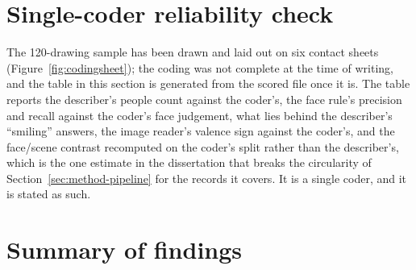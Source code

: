 

\section{Single-coder reliability check}
\label{sec:results-human}

The 120-drawing sample has been drawn and laid out on six contact sheets (Figure~\ref{fig:codingsheet}); the coding was not complete at the time of writing, and the table in this section is generated from the scored file once it is. The table reports the describer's people count against the coder's, the face rule's precision and recall against the coder's face judgement, what lies behind the describer's ``smiling'' answers, the image reader's valence sign against the coder's, and the face/scene contrast recomputed on the coder's split rather than the describer's, which is the one estimate in the dissertation that breaks the circularity of Section~\ref{sec:method-pipeline} for the records it covers. It is a single coder, and it is stated as such.




\section{Summary of findings}
\label{sec:results-summary}

